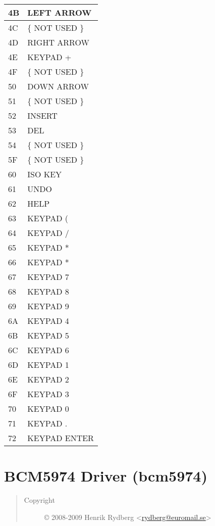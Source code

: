 \documentclass[a4paper,8pt,english]{sphinxmanual}
\begin{document}
\begin{longtable}{|l|l|}
\hline
4B
 & 
LEFT ARROW
\\
\hline
4C
 & 
\{ NOT USED \}
\\
\hline
4D
 & 
RIGHT ARROW
\\
\hline
4E
 & 
KEYPAD +
\\
\hline
4F
 & 
\{ NOT USED \}
\\
\hline
50
 & 
DOWN ARROW
\\
\hline
51
 & 
\{ NOT USED \}
\\
\hline
52
 & 
INSERT
\\
\hline
53
 & 
DEL
\\
\hline
54
 & 
\{ NOT USED \}
\\
\hline
5F
 & 
\{ NOT USED \}
\\
\hline
60
 & 
ISO KEY
\\
\hline
61
 & 
UNDO
\\
\hline
62
 & 
HELP
\\
\hline
63
 & 
KEYPAD (
\\
\hline
64
 & 
KEYPAD /
\\
\hline
65
 & 
KEYPAD *
\\
\hline
66
 & 
KEYPAD *
\\
\hline
67
 & 
KEYPAD 7
\\
\hline
68
 & 
KEYPAD 8
\\
\hline
69
 & 
KEYPAD 9
\\
\hline
6A
 & 
KEYPAD 4
\\
\hline
6B
 & 
KEYPAD 5
\\
\hline
6C
 & 
KEYPAD 6
\\
\hline
6D
 & 
KEYPAD 1
\\
\hline
6E
 & 
KEYPAD 2
\\
\hline
6F
 & 
KEYPAD 3
\\
\hline
70
 & 
KEYPAD 0
\\
\hline
71
 & 
KEYPAD .
\\
\hline
72
 & 
KEYPAD ENTER
\\
\hline\end{longtable}



\section{BCM5974 Driver (bcm5974)}
\label{input/devices/bcm5974:bcm5974-driver-bcm5974}\label{input/devices/bcm5974::doc}\begin{quote}\begin{description}
\item[{Copyright}] \leavevmode
© 2008-2009    Henrik Rydberg \textless{}\href{mailto:rydberg@euromail.se}{rydberg@euromail.se}\textgreater{}

\end{description}\end{quote}
\end{document}
